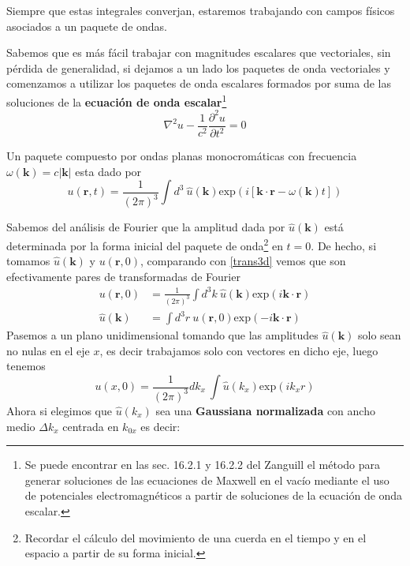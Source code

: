Siempre que estas integrales converjan, estaremos trabajando con campos físicos asociados a un paquete de ondas.

Sabemos que es más fácil trabajar con magnitudes escalares que vectoriales, sin pérdida de generalidad, si dejamos a un lado los paquetes de onda vectoriales y comenzamos a utilizar los paquetes de onda escalares formados por suma de las soluciones de la \textbf{ecuación de onda escalar}\footnote{Se puede encontrar en las sec. 16.2.1 y 16.2.2 del Zanguill el método para generar soluciones de las ecuaciones de Maxwell en el vacío mediante el uso de potenciales electromagnéticos a partir de soluciones de la ecuación de onda escalar.} 
\begin{equation}
    \nabla^2u - \frac{1}{c^2} \frac{\partial^2 u}{\partial t^2} =0
\end{equation}

Un paquete compuesto por ondas planas monocromáticas con frecuencia $\omega(\mathbf{k})= c|\mathbf{k}|$ esta dado por
\begin{equation}
    u(\mathbf{r},t)=\frac{1}{(2\pi)^3} \int d^3~ \hat{u}(\mathbf{k}) \mathrm{exp}(i[\mathbf{k}\cdot\mathbf{r}-\omega(\mathbf{k})t])
\end{equation}

Sabemos del análisis de Fourier que la amplitud dada por $\hat{u}(\mathbf{k})$ está determinada por la forma inicial del paquete de onda\footnote{Recordar el cálculo del movimiento de una cuerda en el tiempo y en el espacio a partir de su forma inicial.} en $t=0$. De hecho, si tomamos $\hat{u}(\mathbf{k})$ y $u(\mathbf{r},0)$, comparando con \ref{trans3d} vemos que son efectivamente pares de transformadas de Fourier
\begin{equation}
    \begin{split}
        u(\mathbf{r},0) &= \frac{1}{(2\pi)^3} \int d^3k~ \hat{u}(\mathbf{k}) \mathrm{exp}(i\mathbf{k}\cdot\mathbf{r}) \\
        \hat{u}(\mathbf{k}) &= \int d^3 r ~ u(\mathbf{r},0) \mathrm{exp}(-i\mathbf{k}\cdot\mathbf{r})
    \end{split}
\end{equation}
Pasemos a un plano unidimensional tomando que las amplitudes $\hat{u}(\mathbf{k})$ solo sean no nulas en el eje $x$, es decir trabajamos solo con vectores en dicho eje, luego tenemos
\begin{equation}
     u(x,0) = \frac{1}{(2\pi)^3} dk_x~ \int \hat{u}(k_x) \mathrm{exp}(i k_x r)
     \label{transgaussiana}
\end{equation}
Ahora si elegimos que $\hat{u}(k_x)$ sea una \textbf{Gaussiana normalizada} con ancho medio $\Delta k_x$ centrada en $k_{0x}$ es decir:

